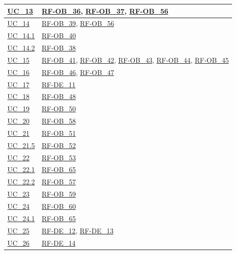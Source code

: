 \begin{longtable}{|>{\raggedright}p{}|>{\raggedright\arraybackslash}p{}|}
    \hline
    \hyperref[uc_13]{UC\_13} & \hyperlink{rf-ob_36}{RF-OB\_36}, \hyperlink{rf-ob_37}{RF-OB\_37}, \hyperlink{rf-ob_56}{RF-OB\_56} \\
    \hline
    \hyperref[uc_14]{UC\_14} & \hyperlink{rf-ob_39}{RF-OB\_39}, \hyperlink{rf-ob_56}{RF-OB\_56} \\
    \hline
    \hyperref[uc_14.1]{UC\_14.1} & \hyperlink{rf-ob_40}{RF-OB\_40} \\
    \hline
    \hyperref[uc_14.2]{UC\_14.2} & \hyperlink{rf-ob_38}{RF-OB\_38} \\
    \hline
    \hyperref[uc_15]{UC\_15} & \hyperlink{rf-ob_41}{RF-OB\_41}, \hyperlink{rf-ob_42}{RF-OB\_42}, \hyperlink{rf-ob_43}{RF-OB\_43}, \hyperlink{rf-ob_44}{RF-OB\_44}, \hyperlink{rf-ob_45}{RF-OB\_45} \\
    \hline
    \hyperref[uc_16]{UC\_16} & \hyperlink{rf-ob_46}{RF-OB\_46}, \hyperlink{rf-ob_47}{RF-OB\_47} \\
    \hline
    \hyperref[uc_17]{UC\_17} & \hyperlink{rf-de_11}{RF-DE\_11} \\
    \hline
    \hyperref[uc_18]{UC\_18} & \hyperlink{rf-ob_48}{RF-OB\_48} \\
    \hline
    \hyperref[uc_19]{UC\_19} & \hyperlink{rf-ob_50}{RF-OB\_50} \\
    \hline
    \hyperref[uc_20]{UC\_20} & \hyperlink{rf-ob_58}{RF-OB\_58} \\
    \hline
    \hyperref[uc_21]{UC\_21} & \hyperlink{rf-ob_51}{RF-OB\_51} \\
    \hline
    \hyperref[uc_21.5]{UC\_21.5} & \hyperlink{rf-ob_52}{RF-OB\_52} \\
    \hline
    \hyperref[uc_22]{UC\_22} & \hyperlink{rf-ob_53}{RF-OB\_53} \\
    \hline
    \hyperref[uc_22.1]{UC\_22.1} & \hyperlink{rf-ob_65}{RF-OB\_65} \\
    \hline
    \hyperref[uc_22.2]{UC\_22.2} & \hyperlink{rf-ob_57}{RF-OB\_57} \\
    \hline
    \hyperref[uc_23]{UC\_23} & \hyperlink{rf-ob_59}{RF-OB\_59} \\
    \hline
    \hyperref[uc_24]{UC\_24} & \hyperlink{rf-ob_60}{RF-OB\_60} \\
    \hline
    \hyperref[uc_24.1]{UC\_24.1} & \hyperlink{rf-ob_65}{RF-OB\_65} \\
    \hline
    \hyperref[uc_25]{UC\_25} & \hyperlink{rf-de_12}{RF-DE\_12}, \hyperlink{rf-de_13}{RF-DE\_13} \\
    \hline
    \hyperref[uc_26]{UC\_26} & \hyperlink{rf-de_14}{RF-DE\_14} \\

\end{longtable}
